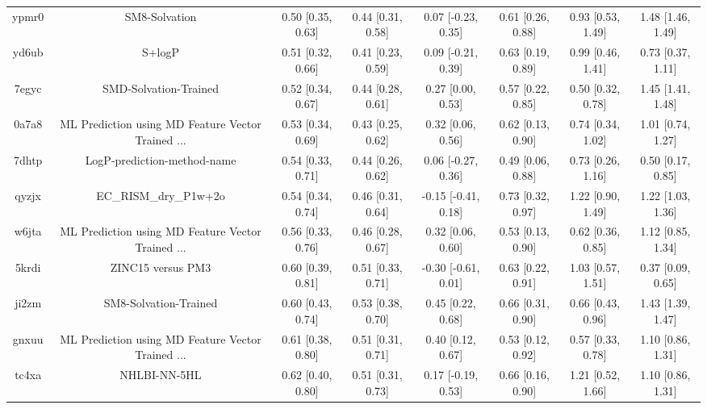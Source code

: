 \documentclass{article}
\begin{document}
\begin{center}
\begin{longtable}{|cccccccc|}
 ypmr0 &                                      SM8-Solvation &  0.50 [0.35, 0.63] &  0.44 [0.31, 0.58] &    0.07 [-0.23, 0.35] &  0.61 [0.26, 0.88] &    0.93 [0.53, 1.49] &     1.48 [1.46, 1.49] \\
 yd6ub &                                             S+logP &  0.51 [0.32, 0.66] &  0.41 [0.23, 0.59] &    0.09 [-0.21, 0.39] &  0.63 [0.19, 0.89] &    0.99 [0.46, 1.41] &     0.73 [0.37, 1.11] \\
 7egyc &                              SMD-Solvation-Trained &  0.52 [0.34, 0.67] &  0.44 [0.28, 0.61] &     0.27 [0.00, 0.53] &  0.57 [0.22, 0.85] &    0.50 [0.32, 0.78] &     1.45 [1.41, 1.48] \\
 0a7a8 &  ML Prediction using MD Feature Vector Trained ... &  0.53 [0.34, 0.69] &  0.43 [0.25, 0.62] &     0.32 [0.06, 0.56] &  0.62 [0.13, 0.90] &    0.74 [0.34, 1.02] &     1.01 [0.74, 1.27] \\
 7dhtp &                        LogP-prediction-method-name &  0.54 [0.33, 0.71] &  0.44 [0.26, 0.62] &    0.06 [-0.27, 0.36] &  0.49 [0.06, 0.88] &    0.73 [0.26, 1.16] &     0.50 [0.17, 0.85] \\
 qyzjx &                              EC\_RISM\_dry\_P1w+2o &  0.54 [0.34, 0.74] &  0.46 [0.31, 0.64] &   -0.15 [-0.41, 0.18] &  0.73 [0.32, 0.97] &    1.22 [0.90, 1.49] &     1.22 [1.03, 1.36] \\
 w6jta &  ML Prediction using MD Feature Vector Trained ... &  0.56 [0.33, 0.76] &  0.46 [0.28, 0.67] &     0.32 [0.06, 0.60] &  0.53 [0.13, 0.90] &    0.62 [0.36, 0.85] &     1.12 [0.85, 1.34] \\
 5krdi &                                  ZINC15 versus PM3 &  0.60 [0.39, 0.81] &  0.51 [0.33, 0.71] &   -0.30 [-0.61, 0.01] &  0.63 [0.22, 0.91] &    1.03 [0.57, 1.51] &     0.37 [0.09, 0.65] \\
 ji2zm &                              SM8-Solvation-Trained &  0.60 [0.43, 0.74] &  0.53 [0.38, 0.70] &     0.45 [0.22, 0.68] &  0.66 [0.31, 0.90] &    0.66 [0.43, 0.96] &     1.43 [1.39, 1.47] \\
 gnxuu &  ML Prediction using MD Feature Vector Trained ... &  0.61 [0.38, 0.80] &  0.51 [0.31, 0.71] &     0.40 [0.12, 0.67] &  0.53 [0.12, 0.92] &    0.57 [0.33, 0.78] &     1.10 [0.86, 1.31] \\
 tc4xa &                                       NHLBI-NN-5HL &  0.62 [0.40, 0.80] &  0.51 [0.31, 0.73] &    0.17 [-0.19, 0.53] &  0.66 [0.16, 0.90] &    1.21 [0.52, 1.66] &     1.10 [0.86, 1.31] \\

\end{longtable}
\end{center}
\end{document}
